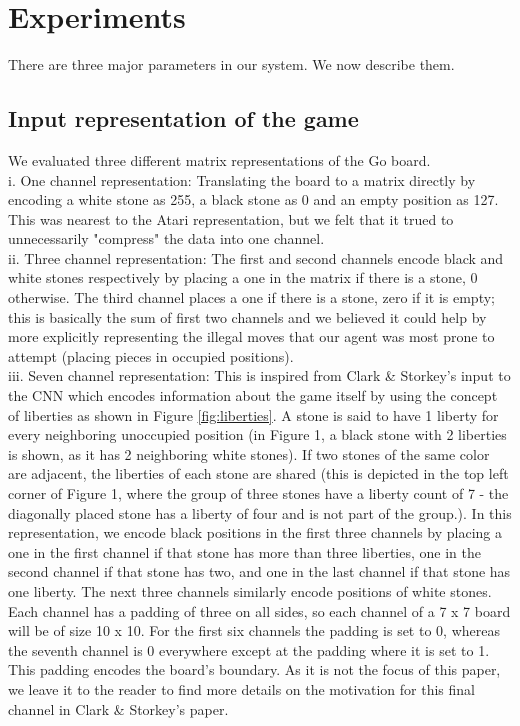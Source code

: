 \section{Experiments}
There are three major parameters in our system. We now describe them.
\subsection{Input representation of the game}
We evaluated three different matrix representations of the Go board.
\\
i. One channel representation: Translating the board to a matrix directly by encoding a white stone as 255, a black stone as 0 and an empty position as 127. This was nearest to the Atari representation, but we felt that it trued to unnecessarily "compress" the data into one channel.
\\ii. Three channel representation: The first and second channels encode black and white stones respectively by placing a one in the matrix if there is a stone, 0 otherwise. The third channel places a one if there is a stone, zero if it is empty; this is basically the sum of first two channels and we believed it could help by more explicitly representing the illegal moves that our agent was most prone to attempt (placing pieces in occupied positions).
\\
iii. Seven channel representation: This is inspired from Clark \& Storkey's input to the CNN which encodes information about the game itself by using the concept of liberties as shown in Figure \ref{fig:liberties}. A stone is said to have 1 liberty for every neighboring unoccupied position (in Figure 1, a black stone with 2 liberties is shown, as it has 2 neighboring white stones). If two stones of the same color are adjacent, the liberties of each stone are shared (this is depicted in the top left corner of Figure 1, where the group of three stones have a liberty count of 7 - the diagonally placed stone has a liberty of four and is not part of the group.). In this representation, we encode black positions in the first three channels by placing a one in the first channel if that stone has more than three liberties, one in the second channel if that stone has two, and one in the last channel if that stone has one liberty. The next three channels similarly encode positions of white stones. Each channel has a padding of three on all sides, so each channel of a 7 x 7 board will be of size 10 x 10. For the first six channels the padding is set to 0, whereas the seventh channel is 0 everywhere except at the padding where it is set to 1. This padding encodes the board's boundary. As it is not the focus of this paper, we leave it to the reader to find more details on the motivation for this final channel in Clark \& Storkey's paper.
